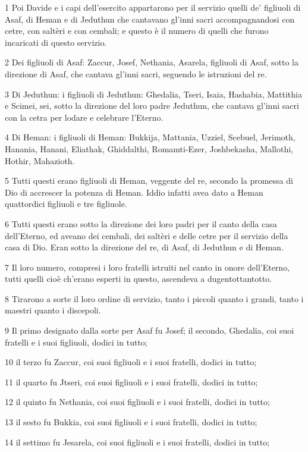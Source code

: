 \par 1 Poi Davide e i capi dell'esercito appartarono per il servizio quelli de' figliuoli di Asaf, di Heman e di Jeduthun che cantavano gl'inni sacri accompagnandosi con cetre, con saltèri e con cembali; e questo è il numero di quelli che furono incaricati di questo servizio.
\par 2 Dei figliuoli di Asaf: Zaccur, Josef, Nethania, Asarela, figliuoli di Asaf, sotto la direzione di Asaf, che cantava gl'inni sacri, seguendo le istruzioni del re.
\par 3 Di Jeduthun: i figliuoli di Jeduthun: Ghedalia, Tseri, Isaia, Hashabia, Mattithia e Scimei, sei, sotto la direzione del loro padre Jeduthun, che cantava gl'inni sacri con la cetra per lodare e celebrare l'Eterno.
\par 4 Di Heman: i figliuoli di Heman: Bukkija, Mattania, Uzziel, Scebuel, Jerimoth, Hanania, Hanani, Eliathak, Ghiddalthi, Romamti-Ezer, Joshbekasha, Mallothi, Hothir, Mahazioth.
\par 5 Tutti questi erano figliuoli di Heman, veggente del re, secondo la promessa di Dio di accrescer la potenza di Heman. Iddio infatti avea dato a Heman quattordici figliuoli e tre figliuole.
\par 6 Tutti questi erano sotto la direzione dei loro padri per il canto della casa dell'Eterno, ed aveano dei cembali, dei saltèri e delle cetre per il servizio della casa di Dio. Eran sotto la direzione del re, di Asaf, di Jeduthun e di Heman.
\par 7 Il loro numero, compresi i loro fratelli istruiti nel canto in onore dell'Eterno, tutti quelli cioè ch'erano esperti in questo, ascendeva a dugentottantotto.
\par 8 Tirarono a sorte il loro ordine di servizio, tanto i piccoli quanto i grandi, tanto i maestri quanto i discepoli.
\par 9 Il primo designato dalla sorte per Asaf fu Josef; il secondo, Ghedalia, coi suoi fratelli e i suoi figliuoli, dodici in tutto;
\par 10 il terzo fu Zaccur, coi suoi figliuoli e i suoi fratelli, dodici in tutto;
\par 11 il quarto fu Jtseri, coi suoi figliuoli e i suoi fratelli, dodici in tutto;
\par 12 il quinto fu Nethania, coi suoi figliuoli e i suoi fratelli, dodici in tutto;
\par 13 il sesto fu Bukkia, coi suoi figliuoli e i suoi fratelli, dodici in tutto;
\par 14 il settimo fu Jesarela, coi suoi figliuoli e i suoi fratelli, dodici in tutto;
